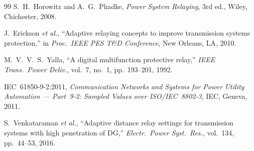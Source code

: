 \documentclass[11pt, a4paper]{article}
\begin{document}
\begin{thebibliography}{99}
S.~H.~Horowitz and A.~G.~Phadke,
\emph{Power System Relaying}, 3rd ed., Wiley, Chichester, 2008.

J.~Erickson \emph{et al.},
``Adaptive relaying concepts to improve transmission systems protection,''
in \emph{Proc.\ IEEE PES T\&D Conference}, New Orleans, LA, 2010.

M.~V.~V.~S.~Yalla,
``A digital multifunction protective relay,''
\emph{IEEE Trans.\ Power Deliv.}, vol.~7, no.~1, pp.~193--201, 1992.

IEC~61850-9-2:2011, \emph{Communication Networks and Systems for Power
Utility Automation --- Part~9-2: Sampled Values over ISO/IEC~8802-3},
IEC, Geneva, 2011.

S.~Venkataraman \emph{et al.},
``Adaptive distance relay settings for transmission systems with high
penetration of DG,''
\emph{Electr.\ Power Syst.\ Res.}, vol.~134, pp.~44--53, 2016.
\end{thebibliography}
\end{document}
